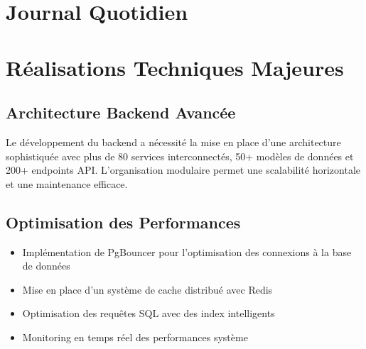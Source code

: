 \documentclass[12pt,a4paper]{article}
\begin{document}
\section{Journal Quotidien}




























\section{Réalisations Techniques Majeures}

\subsection{Architecture Backend Avancée}

Le développement du backend a nécessité la mise en place d'une architecture sophistiquée avec plus de 80 services interconnectés, 50+ modèles de données et 200+ endpoints API. L'organisation modulaire permet une scalabilité horizontale et une maintenance efficace.

\subsection{Optimisation des Performances}

\begin{itemize}
    \item Implémentation de PgBouncer pour l'optimisation des connexions à la base de données
    \item Mise en place d'un système de cache distribué avec Redis
    \item Optimisation des requêtes SQL avec des index intelligents
    \item Monitoring en temps réel des performances système
\end{itemize}
\end{document}
